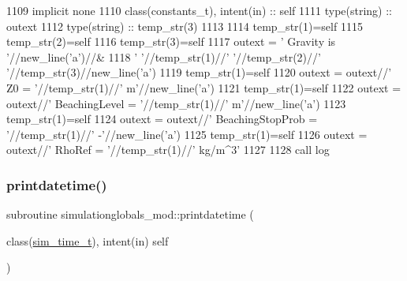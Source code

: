 \begin{DoxyCode}
1109     \textcolor{keywordtype}{implicit none}
1110     \textcolor{keywordtype}{class}(constants\_t), \textcolor{keywordtype}{intent(in)} :: self
1111     \textcolor{keywordtype}{type}(string) :: outext
1112     \textcolor{keywordtype}{type}(string) :: temp\_str(3)
1113 
1114     temp\_str(1)=self%
1115     temp\_str(2)=self%
1116     temp\_str(3)=self%
1117     outext = \textcolor{stringliteral}{'      Gravity is '}//new\_line(\textcolor{stringliteral}{'a'})//&
1118         \textcolor{stringliteral}{'       '}//temp\_str(1)//\textcolor{stringliteral}{' '}//temp\_str(2)//\textcolor{stringliteral}{' '}//temp\_str(3)//new\_line(\textcolor{stringliteral}{'a'})
1119     temp\_str(1)=self%
1120     outext = outext//\textcolor{stringliteral}{'       Z0 = '}//temp\_str(1)//\textcolor{stringliteral}{' m'}//new\_line(\textcolor{stringliteral}{'a'})
1121     temp\_str(1)=self%
1122     outext = outext//\textcolor{stringliteral}{'       BeachingLevel = '}//temp\_str(1)//\textcolor{stringliteral}{' m'}//new\_line(\textcolor{stringliteral}{'a'})
1123     temp\_str(1)=self%
1124     outext = outext//\textcolor{stringliteral}{'       BeachingStopProb = '}//temp\_str(1)//\textcolor{stringliteral}{' -'}//new\_line(\textcolor{stringliteral}{'a'})
1125     temp\_str(1)=self%
1126     outext = outext//\textcolor{stringliteral}{'       RhoRef = '}//temp\_str(1)//\textcolor{stringliteral}{' kg/m^3'}
1127 
1128     \textcolor{keyword}{call }log%
\end{DoxyCode}
\mbox{\label{namespacesimulationglobals__mod_abd0e28a5ec7733d0292dd8e631e96577}} 
\subsubsection{\texorpdfstring{printdatetime()}{printdatetime()}}
{\footnotesize\ttfamily subroutine simulationglobals\+\_\+mod\+::printdatetime (\begin{DoxyParamCaption}\item[{class(\mbox{\hyperlink{structsimulationglobals__mod_1_1sim__time__t}{sim\+\_\+time\+\_\+t}}), intent(in)}]{self }\end{DoxyParamCaption})\hspace{0.3cm}{\ttfamily [private]}}



